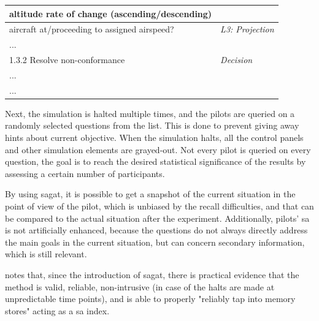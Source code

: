 \begin{table}[]
\begin{tabularx}{\linewidth}{X|l}
		\hspace{.25cm}\hspace{.25cm}\hspace{.25cm}\hspace{.25cm}altitude rate of change (ascending/descending)           &                                             \\ \hline
		\hspace{.25cm}\hspace{.25cm}aircraft at/proceeding to assigned airspeed?             & \textit{L3: Projection}                     \\ \hline
		\hspace{.25cm}...                                                      & \textit{}                                   \\ \hline
		1.3.2 Resolve non-conformance                            & \textit{Decision}                           \\ \hline
		\hspace{.25cm}...                                                      & \textit{}                                   \\ \hline
		...                                                      & \textit{}                                   \\ \hline
	\end{tabularx}
\end{table}
Next, the simulation is halted multiple times, and the pilots are queried on a randomly selected questions from the list. This is done to prevent giving away hints about current objective. When the simulation halts, all the control panels and other simulation elements are grayed-out. Not every pilot is queried on every question, the goal is to reach the desired statistical significance of the results by assessing a certain number of participants.

By using \gls{sagat}, it is possible to get a snapshot of the current situation in the point of view of the pilot, which is unbiased by the recall difficulties, and that can be compared to the actual situation after the experiment. Additionally, pilots' \gls{sa} is not artificially enhanced, because the questions do not always directly address the main goals in the current situation, but can concern secondary information, which is still relevant.

\parencite{endsley_direct_nodate} notes that, since the introduction of \gls{sagat}, there is practical evidence that the method is valid, reliable, non-intrusive (in case of the halts are made at unpredictable time points), and is able to properly "reliably tap into memory stores" acting as a \gls{sa} index. 


